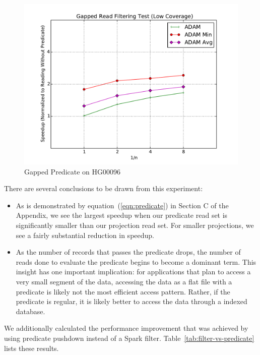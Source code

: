 \documentclass[10pt,twocolumn]{article}
\theoremstyle{plain}
\begin{document}
\begin{figure}[h]
\begin{center}
\includegraphics[width=\linewidth]{microbenchmarks/gapped_predicate_low_coverage.pdf}
\end{center}
\caption{Gapped Predicate on HG00096}
\label{fig:gapped-filter}
\end{figure}

There are several conclusions to be drawn from this experiment:

\begin{itemize}
\item As is demonstrated by equation~(\ref{eqn:predicate}) in Section C of the Appendix, we see the largest speedup when our predicate read set is significantly
smaller than our projection read set. For smaller projections, we see a fairly substantial reduction in speedup.
\item As the number of records that passes the predicate drops, the number of reads done to evaluate the predicate begins to become
a dominant term. This insight has one important implication: for applications that plan to access a very small segment of the data, accessing the
data as a flat file with a predicate is likely not the most efficient access pattern. Rather, if the predicate is regular, it is likely better to access
the data through a indexed database.
\end{itemize}

We additionally calculated the performance improvement that was achieved by using predicate pushdown instead of a Spark filter.
Table~\ref{tab:filter-vs-predicate} lists these results.
\end{document}
